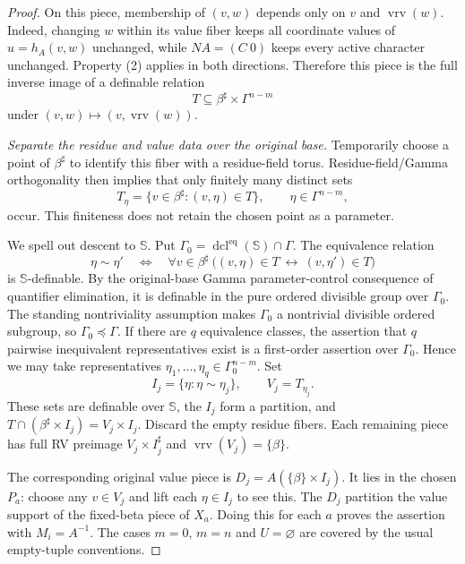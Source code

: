 \documentclass[12pt]{amsart}
\newcommand{\vrv}{\operatorname{vrv}}
\newcommand{\dcl}{\operatorname{dcl}}
\newcommand{\Sbase}{\mathbb S}
\numberwithin{equation}{section}
\begin{document}
{\begin{proof}
On this piece, membership of $(v,w)$ depends only on $v$ and
$\vrv(w)$. Indeed, changing $w$ within its value fiber keeps all
coordinate values of $u=h_A(v,w)$ unchanged, while $NA=(C\ 0)$
keeps every active character unchanged. Property (2) applies in
both directions. Therefore this piece is the full inverse image
of a definable relation
\[
 T\subseteq\beta^\sharp\times\Gamma^{n-m}
\]
under $(v,w)\mapsto(v,\vrv(w))$.

\emph{Separate the residue and value data over the original base.}
Temporarily choose a point of $\beta^\sharp$ to identify this
fiber with a residue-field torus. Residue-field/Gamma
orthogonality then implies that only finitely many distinct sets
\[
 T_\eta=\{v\in\beta^\sharp:(v,\eta)\in T\},
 \qquad \eta\in\Gamma^{n-m},
\]
occur. This finiteness does not retain the chosen point as a
parameter.

We spell out descent to $\Sbase$. Put
$\Gamma_0=\dcl^{\mathrm{eq}}(\Sbase)\cap\Gamma$.
The equivalence relation
\[
 \eta\sim\eta' \quad\Longleftrightarrow\quad
 \forall v\in\beta^\sharp\
 \big((v,\eta)\in T\ \longleftrightarrow\ (v,\eta')\in T\big)
\]
is $\Sbase$-definable. By the original-base Gamma
parameter-control consequence of quantifier elimination, it is
definable in the pure ordered divisible group over $\Gamma_0$.
The standing nontriviality assumption makes $\Gamma_0$ a
nontrivial divisible ordered subgroup, so
$\Gamma_0\preceq\Gamma$. If there are $q$ equivalence classes,
the assertion that $q$ pairwise inequivalent representatives
exist is a first-order assertion over $\Gamma_0$. Hence we may
take representatives $\eta_1,\ldots,\eta_q\in\Gamma_0^{n-m}$.
Set
\[
 I_j=\{\eta:\eta\sim\eta_j\},\qquad V_j=T_{\eta_j}.
\]
These sets are definable over $\Sbase$, the $I_j$ form a
partition, and
$T\cap(\beta^\sharp\times I_j)=V_j\times I_j$.
Discard the empty residue fibers. Each remaining piece has
full RV preimage $V_j\times I_j^\sharp$ and
$\vrv(V_j)=\{\beta\}$.

The corresponding original value piece is
$D_j=A(\{\beta\}\times I_j)$. It lies in the chosen $P_a$:
choose any $v\in V_j$ and lift each $\eta\in I_j$ to see this.
The $D_j$ partition the value support of the fixed-beta piece
of $X_a$.
Doing this for each $a$ proves the assertion with
$M_i=A^{-1}$. The cases $m=0$, $m=n$ and $U=\varnothing$
are covered by the usual empty-tuple conventions.
\end{proof}
}
\end{document}
